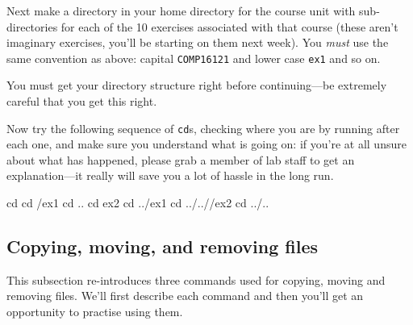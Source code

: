 \begin{firstonly}

Next make a directory in your home directory for the
 course unit with sub-directories for each of the 10
exercises associated with that course (these aren't imaginary exercises, you'll be starting on them next week). You \emph{must} use the same
convention as above: capital \texttt{COMP16121} and lower case \texttt{ex1} and so on.

You must get your directory structure right before continuing---be extremely careful that you get this right.
  



%

Now try the following sequence of \texttt{cd}s, checking where you are by running  after each one, and make sure you understand what is going on: if you're at all unsure about what has happened, please grab a member of lab staff to get an explanation---it really will save you a lot of hassle in the long run.

\begin{ttoutenv}
  cd \return
  cd \crsname/ex1 \return
  cd .. \return
  cd ex2 \return
  cd ../ex1 \return
  cd ../../\crsname/ex2 \return
  cd ../.. \return
\end{ttoutenv}
%

\end{firstonly}

\subsection{Copying, moving, and removing files}

This subsection re-introduces three commands used for copying, moving and
removing files. We'll first describe each command and then you'll get an opportunity to practise using them.

